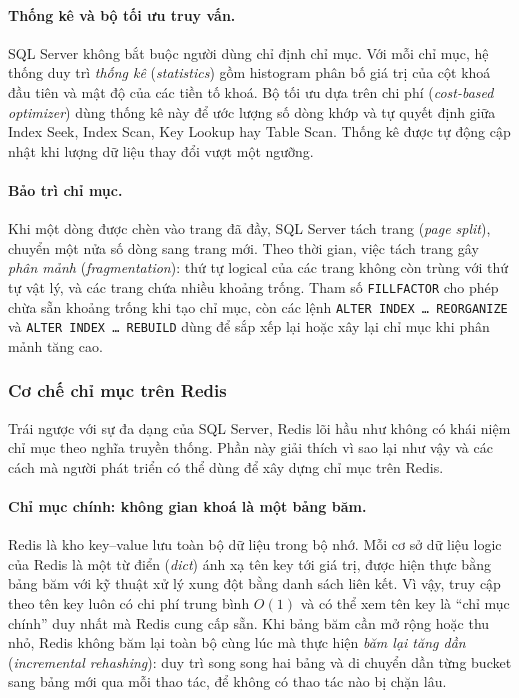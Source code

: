 \paragraph{Thống kê và bộ tối ưu truy vấn.} SQL Server không bắt buộc người dùng chỉ định chỉ mục. Với mỗi chỉ mục, hệ thống duy trì \emph{thống kê} (\emph{statistics}) gồm histogram phân bố giá trị của cột khoá đầu tiên và mật độ của các tiền tố khoá. Bộ tối ưu dựa trên chi phí (\emph{cost-based optimizer}) dùng thống kê này để ước lượng số dòng khớp và tự quyết định giữa Index Seek, Index Scan, Key Lookup hay Table Scan. Thống kê được tự động cập nhật khi lượng dữ liệu thay đổi vượt một ngưỡng.

\paragraph{Bảo trì chỉ mục.} Khi một dòng được chèn vào trang đã đầy, SQL Server tách trang (\emph{page split}), chuyển một nửa số dòng sang trang mới. Theo thời gian, việc tách trang gây \emph{phân mảnh} (\emph{fragmentation}): thứ tự logical của các trang không còn trùng với thứ tự vật lý, và các trang chứa nhiều khoảng trống. Tham số \texttt{FILLFACTOR} cho phép chừa sẵn khoảng trống khi tạo chỉ mục, còn các lệnh \texttt{ALTER INDEX \ldots{} REORGANIZE} và \texttt{ALTER INDEX \ldots{} REBUILD} dùng để sắp xếp lại hoặc xây lại chỉ mục khi phân mảnh tăng cao.

\subsubsection{Cơ chế chỉ mục trên Redis}
\label{subsubsec:indexing-redis}

Trái ngược với sự đa dạng của SQL Server, Redis lõi hầu như không có khái niệm chỉ mục theo nghĩa truyền thống. Phần này giải thích vì sao lại như vậy và các cách mà người phát triển có thể dùng để xây dựng chỉ mục trên Redis.

\paragraph{Chỉ mục chính: không gian khoá là một bảng băm.} Redis là kho key--value lưu toàn bộ dữ liệu trong bộ nhớ. Mỗi cơ sở dữ liệu logic của Redis là một từ điển (\emph{dict}) ánh xạ tên key tới giá trị, được hiện thực bằng bảng băm với kỹ thuật xử lý xung đột bằng danh sách liên kết. Vì vậy, truy cập theo tên key luôn có chi phí trung bình $O(1)$ và có thể xem tên key là ``chỉ mục chính'' duy nhất mà Redis cung cấp sẵn. Khi bảng băm cần mở rộng hoặc thu nhỏ, Redis không băm lại toàn bộ cùng lúc mà thực hiện \emph{băm lại tăng dần} (\emph{incremental rehashing}): duy trì song song hai bảng và di chuyển dần từng bucket sang bảng mới qua mỗi thao tác, để không có thao tác nào bị chặn lâu.


